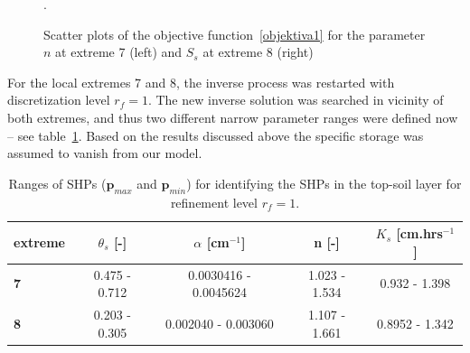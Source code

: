 \documentclass[review,times,3p,twocolumn,10pt]{elsarticle}
\renewcommand{\vec}{\mathbf}
\newcommand{\fs}{\footnotesize}
\begin{document}
\begin{figure}
\caption{Scatter plots of the objective function~\eqref{objektiva1} for the parameter $n$ at extreme 7 (left)  and $S_s$ at extreme 8  (right)}.
\label{objfnc6.2}
\end{figure}

For the local extremes 7 and 8, the inverse process was restarted with discretization level $r_f=1$. 
The new inverse solution was searched in  vicinity of both extremes, and thus two different narrow parameter ranges were defined now -- see table~\ref{rozsahy2}. Based on the results discussed above the specific storage was assumed to vanish from our model. 


\begin{table}[ht]
\begin{center}
\caption{Ranges of SHPs ($\vec{p}_{max}$ and $\vec{p}_{min}$) for identifying the SHPs in the top-soil layer for { refinement level} $r_f=1$. }
\fs
\begin{tabular}{ l || c | c| c| c }
\toprule
extreme & $\theta_s$ [-]&$\alpha$ [cm$^{-1}$]&n [-]& $K_s$ [cm.hrs$^{-1}$]  \\ \hline
\toprule
{\bf 7} & 0.475 - 0.712 & \num{.0030416} - \num{.0045624} & 1.023 - 1.534 & 0.932 - 1.398 \\
{\bf 8} & 0.203 - 0.305 & \num{.002040} - \num{.003060} & 1.107 - 1.661 & 0.8952 - 1.342  \\
\toprule
\end{tabular}
\label{rozsahy2}
\end{center}
\end{table}
\end{document}
